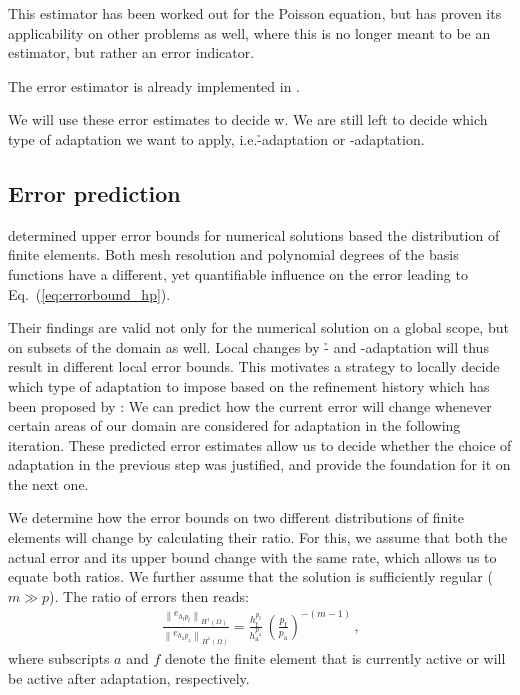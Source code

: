 This estimator has been worked out for the Poisson equation, but has proven its applicability on other problems as well, where this is no longer meant to be an estimator, but rather an error indicator.

The error estimator is already implemented in \dealii{}. 

We will use these error estimates to decide w. We are still left to decide which type of adaptation we want to apply, i.e.\@ \h-adaptation or \p-adaptation.



\subsection{Error prediction}
\label{ssec:prediction}

\cite{babuska1990} determined upper error bounds for numerical solutions based the distribution of finite elements. Both mesh resolution and polynomial degrees of the basis functions have a different, yet quantifiable influence on the error leading to Eq.~(\ref{eq:errorbound_hp}).

Their findings are valid not only for the numerical solution on a global scope, but on subsets of the domain as well. Local changes by \h- and \p-adaptation will thus result in different local error bounds. This motivates a strategy to locally decide which type of adaptation to impose based on the refinement history which has been proposed by \textcite{melenk2001}: We can predict how the current error will change whenever certain areas of our domain are considered for adaptation in the following iteration. These predicted error estimates allow us to decide whether the choice of adaptation in the previous step was justified, and provide the foundation for it on the next one.

We determine how the error bounds on two different distributions of finite elements will change by calculating their ratio. For this, we assume that both the actual error and its upper bound change with the same rate, which allows us to equate both ratios. We further assume that the solution is sufficiently regular ($m \gg p$). The ratio of errors then reads:
\begin{align}
\label{eq:errorratio_hp} \frac{\left\|e_{h_\text{f} p_\text{f}}\right\|_{H^{1}(\Omega)}}{\left\|e_{h_\text{a} p_\text{a}}\right\|_{H^{1}(\Omega)}} = \frac{h_\text{f}^{p_\text{f}}}{h_\text{a}^{p_\text{a}}} \, \left(\frac{p_\text{f}}{p_\text{a}}\right)^{-(m-1)} \,\text{,}
\end{align}
where subscripts $a$ and $f$ denote the finite element that is currently active or will be active after adaptation, respectively.


